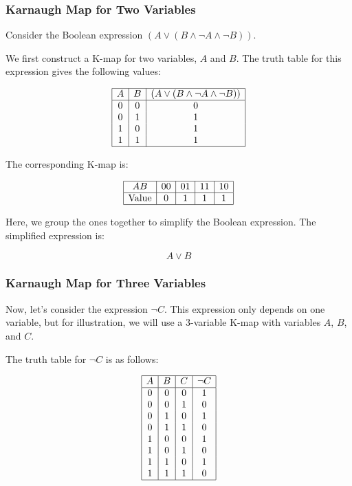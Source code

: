 \subsubsection{Karnaugh Map for Two Variables}

Consider the Boolean expression \( (A \lor (B \land \neg A \land \neg B)) \).

We first construct a K-map for two variables, \(A\) and \(B\). The truth table for this expression 
gives the following values:

\[
	\begin{array}{|c|c|c|}
		\hline
		A & B & (A \lor (B \land \neg A \land \neg B)) \\
		\hline
		0 & 0 & 0                                      \\
		0 & 1 & 1                                      \\
		1 & 0 & 1                                      \\
		1 & 1 & 1                                      \\
		\hline
	\end{array}
\]

The corresponding K-map is:

\[
	\begin{array}{|c|c|c|c|c|}
		\hline
		AB           & 00 & 01 & 11 & 10 \\
		\hline
		\text{Value} & 0  & 1  & 1  & 1  \\
		\hline
	\end{array}
\]

Here, we group the ones together to simplify the Boolean expression. The simplified expression is:

\[
	A \lor B
\]

\subsubsection{Karnaugh Map for Three Variables}

Now, let's consider the expression \( \neg C \). This expression only 
depends on one variable, but for illustration, we will use a 
3-variable K-map with variables \(A\), \(B\), and \(C\).

The truth table for \( \neg C \) is as follows:

\[
	\begin{array}{|c|c|c|c|}
		\hline
		A & B & C & \neg C \\
		\hline
		0 & 0 & 0 & 1      \\
		0 & 0 & 1 & 0      \\
		0 & 1 & 0 & 1      \\
		0 & 1 & 1 & 0      \\
		1 & 0 & 0 & 1      \\
		1 & 0 & 1 & 0      \\
		1 & 1 & 0 & 1      \\
		1 & 1 & 1 & 0      \\
		\hline
	\end{array}
\]

